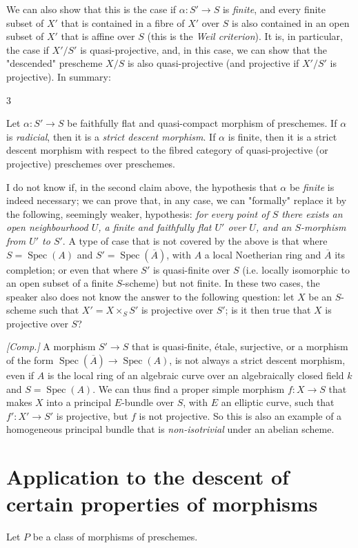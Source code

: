  We can also show that this is the case if \(\alpha \colon  S'\to  S\) is \emph{finite}, and every finite subset of \(X'\) that is contained in a fibre of \(X'\) over \(S\) is also contained in an open subset of \(X'\) that is affine over \(S\) (this is the \emph{Weil criterion}).
  It is, in particular, the case if \(X'/S'\) is quasi-projective, and, in this case, we can show that the "descended" prescheme \(X/S\) is also quasi-projective (and projective if \(X'/S'\) is projective).
  In summary:\begin{theorem}{3}\label{fga3.i-b.1-theorem-3}\skipsinglepar\par{}Let \(\alpha \colon  S'\to  S\) be faithfully flat and quasi-compact morphism of preschemes.
    If \(\alpha \) is \emph{radicial}, then it is a \emph{strict descent morphism}.
    If \(\alpha \) is finite, then it is a strict descent morphism with respect to the fibred category of quasi-projective (or projective) preschemes over preschemes.\end{theorem}\begin{remark}{}\label{fga3.i-b.1-remark}\skipsinglepar\par{}I do not know if, in the second claim above, the hypothesis that \(\alpha \) be \emph{finite} is indeed necessary;
    we can prove that, in any case, we can "formally" replace it by the following, seemingly weaker, hypothesis:
    \emph{for every point of \(S\) there exists an open neighbourhood \(U\), a finite and faithfully flat \(U'\) over \(U\), and an \(S\)-morphism from \(U'\) to \(S'\)}.
    A type of case that is not covered by the above is that where \(S=\operatorname {Spec}(A)\) and \(S'=\operatorname {Spec}(\overline {A})\), with \(A\) a local Noetherian ring and \(\overline {A}\) its completion;
    or even that where \(S'\) is quasi-finite over \(S\) (i.e. locally isomorphic to an open subset of a finite \(S\)-scheme) but not finite.
    In these two cases, the speaker also does not know the answer to the following question:
    let \(X\) be an \(S\)-scheme such that \(X'=X\times _S S'\) is projective over \(S'\);
    is it then true that \(X\) is projective over \(S\)?\par{}\emph{[Comp.]}
    A morphism \(S'\to  S\) that is quasi-finite, étale, surjective, or a morphism of the form \(\operatorname {Spec}(\overline {A})\to \operatorname {Spec}(A)\), is not always a strict descent morphism, even if \(A\) is the local ring of an algebraic curve over an algebraically closed field \(k\) and \(S=\operatorname {Spec}(A)\).
    We can thus find a proper simple morphism \(f\colon  X\to  S\) that makes \(X\) into a principal \(E\)-bundle over \(S\), with \(E\) an elliptic curve, such that \(f'\colon  X'\to  S'\) is projective, but \(f\) is not projective.
    So this is also an example of a homogeneous principal bundle that is \emph{non-isotrivial} under an abelian scheme.\end{remark}\section{Application to the descent of certain properties of morphisms}\label{fga3.i-b.2}\par{}Let \(P\) be a class of morphisms of preschemes.
